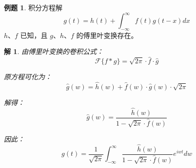 \documentclass[12pt,a4paper]{article}
\numberwithin{subsection}{section}   %
\numberwithin{subsubsection}{subsection}
\theoremstyle{plain}
\newtheorem{solution}{解}[subsection]  %
\theoremstyle{definition}
\newtheorem{example}{例题}[subsection]  %
\theoremstyle{remark}
\theoremstyle{remark}
\begin{document}
\begin{example}
	积分方程解
	\begin{equation}
	  g(t) = h(t) + \int_{-\infty}^{\infty} f(t) g(t - x) dx
\end{equation}
	\( h \)、\( f \) 已知，且 \( g \)、\( h \)、\( f \) 的傅里叶变换存在。
	
	\begin{solution}
		由傅里叶变换的卷积公式：
		\begin{equation}
			\mathcal{F}\{f * g\} = \sqrt{2\pi} \cdot \hat{f} \cdot \hat{g}
		\end{equation}
		
		原方程可化为：
		\begin{equation}
			\hat{g}(w) = \hat{h}(w) + \hat{f}(w) \cdot \hat{g}(w) \cdot \sqrt{2\pi}
		\end{equation}
		
		解得：
		\begin{equation}
			\hat{g}(w) = \frac{\hat{h}(w)}{1 - \sqrt{2\pi} \cdot \hat{f}(w)}
		\end{equation}
		
		因此：
		\begin{equation}
			g(t) = \frac{1}{\sqrt{2\pi}} \int_{-\infty}^{\infty} \frac{\hat{h}(w)}{1 - \sqrt{2\pi} \cdot \hat{f}(w)} e^{iwt} dw
		\end{equation}
		
	\end{solution}
\end{example}
\end{document}

